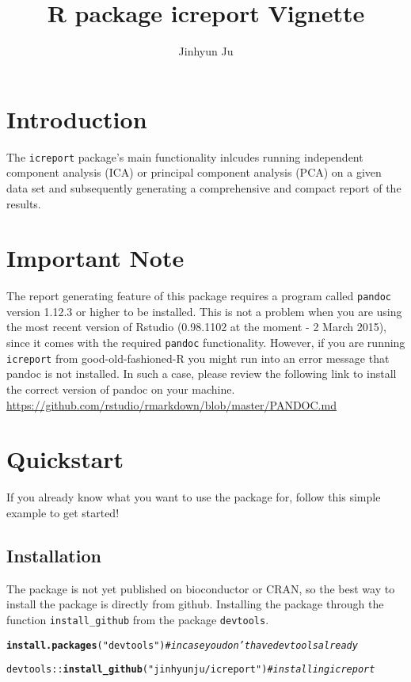 \documentclass[11pt, oneside]{article}\usepackage[]{graphicx}\usepackage[]{color}
\title{R package icreport Vignette }
\author{Jinhyun Ju}
\date{}							%
\makeatletter
\newcommand{\hlstr}[1]{\textcolor[rgb]{0.192,0.494,0.8}{#1}}%
\newcommand{\hlcom}[1]{\textcolor[rgb]{0.678,0.584,0.686}{\textit{#1}}}%
\newcommand{\hlopt}[1]{\textcolor[rgb]{0,0,0}{#1}}%
\newcommand{\hlstd}[1]{\textcolor[rgb]{0.345,0.345,0.345}{#1}}%
\newcommand{\hlkwd}[1]{\textcolor[rgb]{0.737,0.353,0.396}{\textbf{#1}}}%
\newenvironment{kframe}{%
 \def\at@end@of@kframe{}%
 \ifinner\ifhmode%
  \def\at@end@of@kframe{\end{minipage}}%
  \begin{minipage}{\columnwidth}%
 \fi\fi%
 \def\FrameCommand##1{\hskip\@totalleftmargin \hskip-\fboxsep
 \colorbox{shadecolor}{##1}\hskip-\fboxsep
     \hskip-\linewidth \hskip-\@totalleftmargin \hskip\columnwidth}%
 \MakeFramed {\advance\hsize-\width
   \@totalleftmargin\z@ \linewidth\hsize
   \@setminipage}}%
 {\par\unskip\endMakeFramed%
 \at@end@of@kframe}
\newenvironment{knitrout}{}{} %
\makeatother
\begin{document}
\maketitle



\section{Introduction}

The \verb|icreport| package's main functionality inlcudes running independent component analysis (ICA) or principal component analysis (PCA) on a given data set and subsequently generating a comprehensive and compact report of the results.

\section{Important Note}

The report generating feature of this package requires a program called \verb|pandoc| version 1.12.3 or higher to be installed. This is not a problem when you are using the most recent version of Rstudio (0.98.1102 at the moment - 2 March 2015), since it comes with the required \verb|pandoc| functionality. However, if you are running \verb|icreport| from good-old-fashioned-R you might run into an error message that pandoc is not installed. In such a case, please review the following link to install the correct version of pandoc on your machine. \url{https://github.com/rstudio/rmarkdown/blob/master/PANDOC.md}

\section{Quickstart}

If you already know what you want to use the package for, follow this simple example to get started!

\subsection{Installation}

The package is not yet published on bioconductor or CRAN, so the best way to install the package is directly from github. Installing the package through the function \verb|install_github| from the package \verb|devtools|.

\begin{knitrout}
\color{fgcolor}\begin{kframe}
\begin{alltt}
\hlkwd{install.packages}\hlstd{(}\hlstr{"devtools"}\hlstd{)} \hlcom{# in case you don't have devtools already}

\hlstd{devtools}\hlopt{::}\hlkwd{install_github}\hlstd{(}\hlstr{"jinhyunju/icreport"}\hlstd{)} \hlcom{#installing icreport}
\end{alltt}
\end{kframe}
\end{knitrout}
\end{document}
